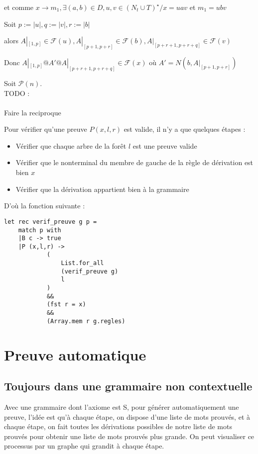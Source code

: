 \documentclass[a4paper,10pt]{article}
\begin{document}
 et comme $x\rightarrow m_1,\exists (a,b) \in D, u,v\in (N_t\cup T)^\star /x = uav$ et $m_1 = ubv$

 Soit $p := |u|, q := |v|, r := |b|$
 
 alors $A|_{[1,p]} \in \mathcal{F}(u), A|_{[p+1,p+r]} \in \mathcal{F}(b), A|_{[p+r+1,p+r+q]} \in \mathcal{F}(v)$

 Donc $A|_{[1,p]}@A'@A|_{[p+r+1,p+r+q]}\in \mathcal{F}(x)$ où $A' = N (b,A|_{[p+1,p+r]})$

 Soit $\mathcal{P}(n)$.\\
{\color{red} TODO :\\\\  Faire la reciproque }\\

Pour vérifier qu'une preuve $P(x,l,r)$ est valide, il n'y a que quelques étapes : 
\begin{itemize}
\item Vérifier que chaque arbre de la forêt $l$ est une preuve valide
\item Vérifier que le nonterminal du membre de gauche de la règle de dérivation est bien $x$
\item Vérifier que la dérivation appartient bien à la grammaire
\end{itemize}
D'où la fonction suivante :
\begin{verbatim}
let rec verif_preuve g p = 
    match p with
    |B c -> true
    |P (x,l,r) -> 
            (
                List.for_all
                (verif_preuve g)
                l
            )
            &&
            (fst r = x)
            &&
            (Array.mem r g.regles)
\end{verbatim}

\section{Preuve automatique}

\subsection{Toujours dans une grammaire non contextuelle}

Avec une grammaire dont l'axiome est S,
pour générer automatiquement une preuve, l'idée est qu'à chaque étape,
on dispose d'une liste de mots prouvés,
et à chaque étape, on fait toutes les dérivations possibles de notre liste de mots prouvés pour obtenir une liste de mots prouvés plus grande.
On peut visualiser ce processus par un graphe qui grandit à chaque étape.
\end{document}
